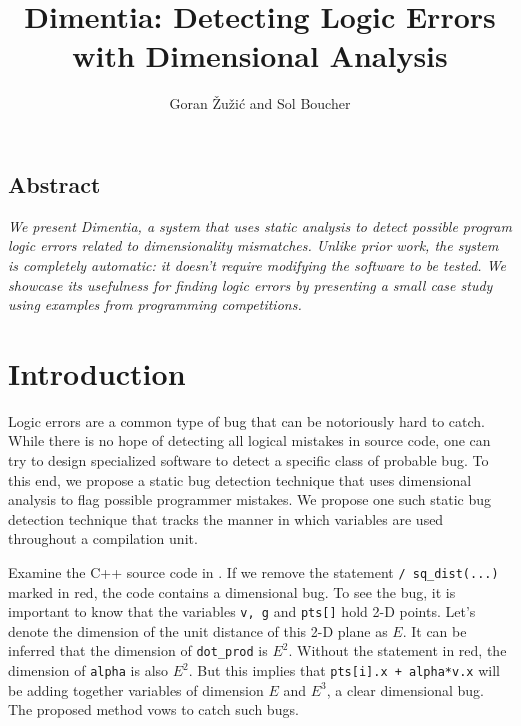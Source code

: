 \documentclass[12pt]{article}
\title{\Large Dimentia: Detecting Logic Errors with Dimensional Analysis}
\author{Goran \v{Z}u\v{z}i\'c and Sol Boucher}
\begin{document}
\maketitle
{}%


\begin{center}
\section*{Abstract}
\parbox{0.8\linewidth}{\textit{We present \textnormal{Dimentia}, a system that uses static analysis to detect possible program logic errors related to dimensionality mismatches.
Unlike prior work, the system is completely automatic: it doesn't require modifying the software to be tested.
We showcase its usefulness for finding logic errors by presenting a small case study using examples from programming competitions.}}
\end{center}

\newpage
{}%

\section{Introduction}

\indent
Logic errors are a common type of bug that can be notoriously hard to catch.
While there is no hope of detecting all logical mistakes in source code, one can try to design specialized software to detect a specific class of probable bug.
To this end, we propose a static bug detection technique that uses dimensional analysis to flag possible programmer mistakes.
We propose one such static bug detection technique that tracks the manner in which variables are used throughout a compilation unit.

Examine the C++ source code in .
If we remove the statement \texttt{/ sq\_dist(...)} marked in red, the code contains a dimensional bug.
To see the bug, it is important to know that the variables \texttt{v, g} and \texttt{pts[]} hold 2-D points.
Let's denote the dimension of the unit distance of this 2-D plane as $E$.
It can be inferred that the dimension of \texttt{dot\_prod} is $E^2$.
Without the statement in red, the dimension of \texttt{alpha} is also $E^2$.
But this implies that \texttt{pts[i].x + alpha*v.x} will be adding together variables of dimension $E$ and $E^3$, a clear dimensional bug.
The proposed method vows to catch such bugs.
\end{document}
